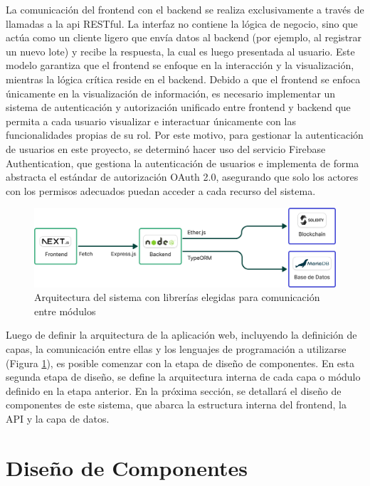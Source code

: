 La comunicación del frontend con el \gls{backend} se realiza exclusivamente a través de llamadas a la \acrshort{api} RESTful. La interfaz no contiene la lógica de negocio, sino que actúa como un cliente ligero que envía datos al backend (por ejemplo, al registrar un nuevo lote) y recibe la respuesta, la cual es luego presentada al usuario. Este modelo garantiza que el frontend se enfoque en la interacción y la visualización, mientras la lógica crítica reside en el backend. Debido a que el frontend se enfoca únicamente en la visualización de información, es necesario implementar un sistema de autenticación y autorización unificado entre frontend y backend que permita a cada usuario visualizar e interactuar únicamente con las funcionalidades propias de su rol. Por este motivo, para gestionar la autenticación de usuarios en este proyecto, se determinó hacer uso del servicio Firebase Authentication, que gestiona la autenticación de usuarios e implementa de forma abstracta el estándar de autorización OAuth 2.0, asegurando que solo los actores con los permisos adecuados puedan acceder a cada recurso del sistema.

\begin{figure}[!t]
    \centering
    \includegraphics[width=\linewidth]{Figures/system-architecture.png}
    \caption{Arquitectura del sistema con librerías elegidas para comunicación entre módulos}
    \label{fig:system-architecture}
\end{figure}

Luego de definir la arquitectura de la aplicación web, incluyendo la definición de capas, la comunicación entre ellas y los lenguajes de programación a utilizarse (Figura \ref{fig:system-architecture}), es posible comenzar con la etapa de diseño de componentes. En esta segunda etapa de diseño, se define la arquitectura interna de cada capa o módulo definido en la etapa anterior. En la próxima sección, se detallará el diseño de componentes de este sistema, que abarca la estructura interna del frontend, la API y la capa de datos.

\section{Diseño de Componentes}
\label{sec:components-design}

